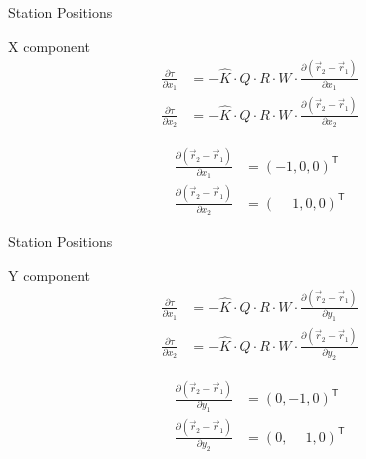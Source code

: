 \documentclass[14pt,table,t, c]{beamer}
\begin{document}
\begin{frame}{Station Positions}
\begin{block}{X component}
\vspace*{-\baselineskip}\setlength\belowdisplayskip{0pt}\setlength\abovedisplayskip{0pt}
\begin{align*}
\frac{\partial \tau}{\partial x_1} &= - \hat{K} \cdot Q \cdot R \cdot W \cdot \frac{\partial (\vec{r}_2 -
\vec{r}_1)}{\partial x_1}\\
\frac{\partial \tau}{\partial x_2} &= - \hat{K} \cdot Q \cdot R \cdot W \cdot \frac{\partial (\vec{r}_2 -
\vec{r}_1)}{\partial x_2} 
\end{align*}
\end{block}
\begin{block}{\vspace*{-3ex}}
\vspace*{-\baselineskip}\setlength\belowdisplayskip{0pt}\setlength\abovedisplayskip{5pt}
\begin{align*}
\frac{\partial (\vec{r}_2 -\vec{r}_1)}{\partial x_1} &= (-1, 0, 0)^\mathsf{T} \\
\frac{\partial (\vec{r}_2 -\vec{r}_1)}{\partial x_2} &= (\phantom{-}1, 0, 0)^\mathsf{T}
\end{align*}
\end{block}
\end{frame}

\begin{frame}{Station Positions}
\begin{block}{Y component}
\vspace*{-\baselineskip}\setlength\belowdisplayskip{0pt}\setlength\abovedisplayskip{0pt}
\begin{align*}
\frac{\partial \tau}{\partial x_1} &= - \hat{K} \cdot Q \cdot R \cdot W \cdot \frac{\partial (\vec{r}_2 -
\vec{r}_1)}{\partial y_1}\\
\frac{\partial \tau}{\partial x_2} &= - \hat{K} \cdot Q \cdot R \cdot W \cdot \frac{\partial (\vec{r}_2 -
\vec{r}_1)}{\partial y_2} 
\end{align*}
\end{block}
\begin{block}{\vspace*{-3ex}}
\vspace*{-\baselineskip}\setlength\belowdisplayskip{0pt}\setlength\abovedisplayskip{5pt}
\begin{align*}
\frac{\partial (\vec{r}_2 -\vec{r}_1)}{\partial y_1} &= (0, -1, 0)^\mathsf{T} \\
\frac{\partial (\vec{r}_2 -\vec{r}_1)}{\partial y_2} &= (0, \phantom{-}1, 0)^\mathsf{T}
\end{align*}
\end{block}
\end{frame}
\end{document}
